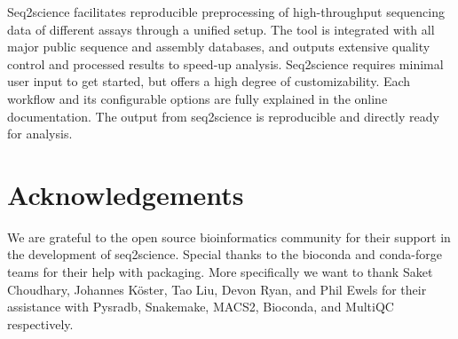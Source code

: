 Seq2science facilitates reproducible preprocessing of high-throughput sequencing data of different assays through a unified setup. The tool is integrated with all major public sequence and assembly databases, and outputs extensive quality control and processed results to speed-up analysis. Seq2science requires minimal user input to get started, but offers a high degree of customizability. Each workflow and its configurable options are fully explained in the online documentation. The output from seq2science is reproducible and directly ready for analysis.

\section{Acknowledgements}

We are grateful to the open source bioinformatics community for their support in the development of seq2science. Special thanks to the bioconda and conda-forge teams for their help with packaging. More specifically we want to thank Saket Choudhary, Johannes K{\"o}ster, Tao Liu, Devon Ryan, and Phil Ewels for their assistance with Pysradb, Snakemake, MACS2, Bioconda, and MultiQC respectively. 
